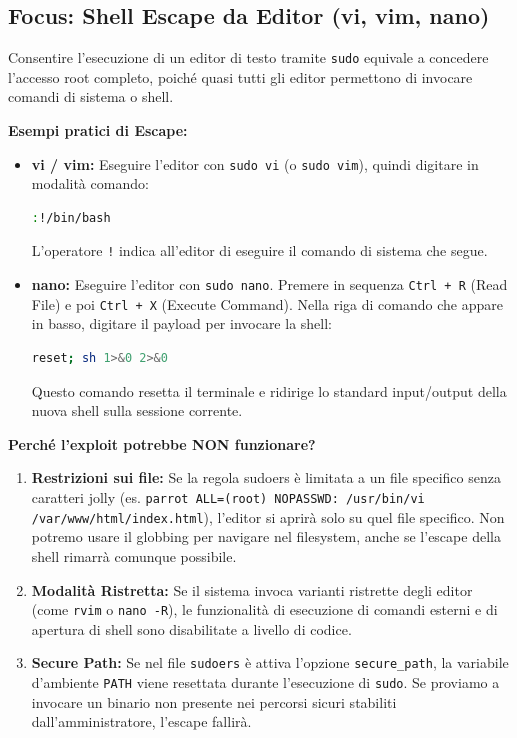 \documentclass[12pt,a4paper]{report}
\begin{document}
	\subsection{Focus: Shell Escape da Editor (vi, vim, nano)}
	Consentire l'esecuzione di un editor di testo tramite \texttt{sudo} equivale a concedere l'accesso root completo, poiché quasi tutti gli editor permettono di invocare comandi di sistema o shell.
	
	\textbf{Esempi pratici di Escape:}
	\begin{itemize}
		\item \textbf{vi / vim:} Eseguire l'editor con \texttt{sudo vi} (o \texttt{sudo vim}), quindi digitare in modalità comando:
		\begin{lstlisting}[language=bash]
			:!/bin/bash
		\end{lstlisting}
		L'operatore \texttt{!} indica all'editor di eseguire il comando di sistema che segue.
		
		\item \textbf{nano:} Eseguire l'editor con \texttt{sudo nano}. Premere in sequenza \texttt{Ctrl + R} (Read File) e poi \texttt{Ctrl + X} (Execute Command). Nella riga di comando che appare in basso, digitare il payload per invocare la shell:
		\begin{lstlisting}[language=bash]
			reset; sh 1>&0 2>&0
		\end{lstlisting}
		Questo comando resetta il terminale e ridirige lo standard input/output della nuova shell sulla sessione corrente.
	\end{itemize}
	
	\textbf{Perché l'exploit potrebbe NON funzionare?}
	\begin{enumerate}
		\item \textbf{Restrizioni sui file:} Se la regola sudoers è limitata a un file specifico senza caratteri jolly (es. \texttt{parrot ALL=(root) NOPASSWD: /usr/bin/vi /var/www/html/index.html}), l'editor si aprirà solo su quel file specifico. Non potremo usare il globbing per navigare nel filesystem, anche se l'escape della shell rimarrà comunque possibile.
		\item \textbf{Modalità Ristretta:} Se il sistema invoca varianti ristrette degli editor (come \texttt{rvim} o \texttt{nano -R}), le funzionalità di esecuzione di comandi esterni e di apertura di shell sono disabilitate a livello di codice.
		\item \textbf{Secure Path:} Se nel file \texttt{sudoers} è attiva l'opzione \texttt{secure\_path}, la variabile d'ambiente \texttt{PATH} viene resettata durante l'esecuzione di \texttt{sudo}. Se proviamo a invocare un binario non presente nei percorsi sicuri stabiliti dall'amministratore, l'escape fallirà.
	\end{enumerate}
	
\end{document}
